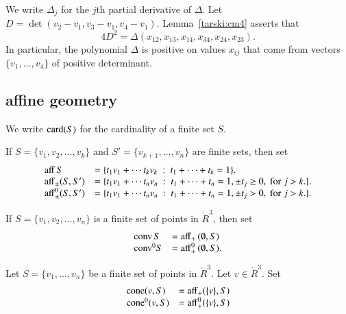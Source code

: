 We write $\Delta_j$ for the $j$th partial derivative of $\Delta$. 
Let $D = \det(v_2-v_1,v_3-v_1,v_4-v_1)$.
Lemma~\ref{tarski:cm4} asserts that 
  $$
  4 D^2 = \Delta(x_{12},x_{13},x_{14},x_{34},x_{24},x_{23}).
  $$
In particular, the polynomial $\Delta$ is positive on values $x_{ij}$
that come from vectors $\{v_1,\ldots,v_4\}$ of positive determinant.





\subsection{affine geometry}

We write ${\operatorname{card}}(S)$ for the cardinality of a finite set $S$.


\begin{definition}\label{def:aff} 
 If $S = \{v_1,v_2,\ldots,v_k\}$ 
and $S'=\{v_{k+1},\ldots,v_n\}$ are  finite sets, then
set
	$$\begin{array}{lll}
      {\operatorname{aff}}\, S &= \{t_1 v_1 +\cdots t_k v_k \ :\ 
	t_1 +\cdots+t_k = 1\}.\\
        {\operatorname{aff}}_{\pm} (S,S') &= \{t_1 v_1 +\cdots t_n v_n \ :\ 
	t_1 +\cdots+t_n = 1, \pm t_j \ge 0, \text{ for } j>k.\}.\\
        {\operatorname{aff}}^0_{\pm} (S,S') &= \{t_1 v_1 +\cdots t_n v_n \ :\ 
	t_1 +\cdots+t_n = 1, \pm t_j > 0, \text{ for } j>k.\}.\\
		\end{array}
        $$
\end{definition}

\begin{definition}  If $S = \{v_1,v_2,\ldots,v_n\}$ is a finite set
of points in $\ring{R}^3$, then
set
	$$
        \begin{array}{lll}
          {\operatorname{conv}}\, S &= {\operatorname{aff}}_+\, (\emptyset,S)\\
	   {\operatorname{conv}}^0 S &= {\operatorname{aff}}^0_+\, (\emptyset,S).\\
           \end{array}
        $$
\end{definition}


\begin{definition}
Let $S=\{v_1,\ldots,v_n\}$ be a finite set of points in 
$\ring{R}^3$.  Let $v\in\ring{R}^3$. Set
  $$\begin{array}{lll}
  {\operatorname{cone}}(v,S) &= {\operatorname{aff}}_+(\{v\},S)\\
  {\operatorname{cone}}^0(v,S) &= {\operatorname{aff}}^0_+(\{v\},S)\\
  \end{array}
  $$
\end{definition}


